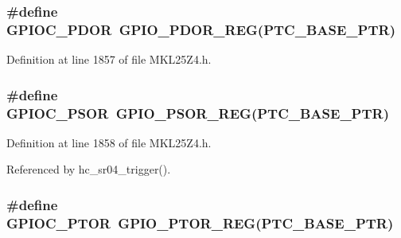 \subsubsection[{\texorpdfstring{G\+P\+I\+O\+C\+\_\+\+P\+D\+OR}{GPIOC_PDOR}}]{\setlength{\rightskip}{0pt plus 5cm}\#define G\+P\+I\+O\+C\+\_\+\+P\+D\+OR~{\bf G\+P\+I\+O\+\_\+\+P\+D\+O\+R\+\_\+\+R\+EG}({\bf P\+T\+C\+\_\+\+B\+A\+S\+E\+\_\+\+P\+TR})}\hypertarget{group___g_p_i_o___register___accessor___macros_ga0e16be0c2882156f81cf74667529fdea}{}\label{group___g_p_i_o___register___accessor___macros_ga0e16be0c2882156f81cf74667529fdea}


Definition at line 1857 of file M\+K\+L25\+Z4.\+h.

\subsubsection[{\texorpdfstring{G\+P\+I\+O\+C\+\_\+\+P\+S\+OR}{GPIOC_PSOR}}]{\setlength{\rightskip}{0pt plus 5cm}\#define G\+P\+I\+O\+C\+\_\+\+P\+S\+OR~{\bf G\+P\+I\+O\+\_\+\+P\+S\+O\+R\+\_\+\+R\+EG}({\bf P\+T\+C\+\_\+\+B\+A\+S\+E\+\_\+\+P\+TR})}\hypertarget{group___g_p_i_o___register___accessor___macros_gae0cc795a0fc8f90ec1d2614c71337a89}{}\label{group___g_p_i_o___register___accessor___macros_gae0cc795a0fc8f90ec1d2614c71337a89}


Definition at line 1858 of file M\+K\+L25\+Z4.\+h.



Referenced by hc\+\_\+sr04\+\_\+trigger().

\subsubsection[{\texorpdfstring{G\+P\+I\+O\+C\+\_\+\+P\+T\+OR}{GPIOC_PTOR}}]{\setlength{\rightskip}{0pt plus 5cm}\#define G\+P\+I\+O\+C\+\_\+\+P\+T\+OR~{\bf G\+P\+I\+O\+\_\+\+P\+T\+O\+R\+\_\+\+R\+EG}({\bf P\+T\+C\+\_\+\+B\+A\+S\+E\+\_\+\+P\+TR})}\hypertarget{group___g_p_i_o___register___accessor___macros_gaf68be8cbaeeb67cf02420bfadc15bf58}{}\label{group___g_p_i_o___register___accessor___macros_gaf68be8cbaeeb67cf02420bfadc15bf58}


